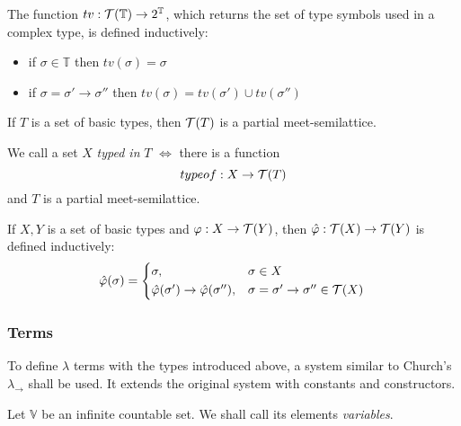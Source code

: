 \documentclass[main.tex]{subfiles}
\begin{document}
\begin{defn}
    The function $tv : \mathcal{T}( \mathbb{T} ) \rightarrow 2^\mathbb{T}$, which
    returns the set of type symbols used in a complex type, is defined inductively:

    \begin{itemize}
        \item if $\sigma \in \mathbb{T}$ then $tv(\sigma) = \sigma$
        \item if $\sigma = \sigma' \rightarrow \sigma''$ then
            $tv(\sigma) = tv(\sigma') \cup tv(\sigma'')$
    \end{itemize}
\end{defn}

\begin{prop}
    If $T$ is a set of basic types, then $\mathcal{T}( T )$ is a partial meet-semilattice.
\end{prop}

\begin{defn}
    We call a set $X$ \emph{typed in} $T$ $\iff$ there is a function
    \[ typeof : X \rightarrow \mathcal{T}( T ) \] and $T$ is a partial meet-semilattice.
\end{defn}

\begin{defn}
    If $X, Y$ is a set of basic types and $\varphi: X \rightarrow \mathcal{T}( Y )$,
    then $\hat{\varphi} : \mathcal{T}( X ) \rightarrow \mathcal{T}( Y )$ is defined inductively:
    \begin{equation*}
        \hat{\varphi}(\sigma) =
        \begin{cases*}
            \sigma, & $\sigma \in X$ \\
            \hat{\varphi}(\sigma') \rightarrow \hat{\varphi}(\sigma''), &
                $\sigma = \sigma' \rightarrow \sigma'' \in \tclos{X}$ \\
        \end{cases*}
    \end{equation*}
\end{defn}

\subsubsection{Terms}
To define $\lambda$ terms with the types introduced above, a system similar
to Church's $\lambda_\rightarrow$ \cite[chap.~2.4]{ttfp} shall be used. It
extends the original system with constants and constructors.

\begin{defn}
    Let $\mathbb{V}$ be an infinite countable set. We shall call its elements
    \emph{variables}.
\end{defn}
\end{document}
